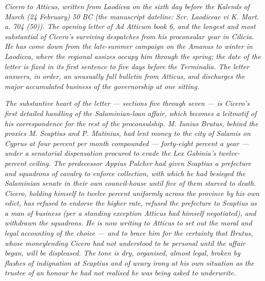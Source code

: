 
\textit{Cicero to Atticus, written from Laodicea on the
sixth day before the Kalends of March (24 February)
50 BC (the manuscript dateline: \textit{Scr.
Laodiceae vi K. Mart. a. 704 (50)}). The opening
letter of \textit{Ad Atticum} book 6, and the longest
and most substantial of Cicero's surviving despatches
from his proconsular year in Cilicia. He has come down
from the late-summer campaign on the Amanus to winter
in Laodicea, where the regional assizes occupy him
through the spring; the date of the letter is fixed in
its first sentence to five days before the Terminalia.
The letter answers, in order, an unusually full
bulletin from Atticus, and discharges the major
accumulated business of the governorship at one
sitting.}

\textit{The substantive heart of the letter --- sections
five through seven --- is Cicero's first detailed
handling of the Salaminian-loan affair, which becomes
a leitmotif of his correspondence for the rest of the
proconsulship. M. Iunius Brutus, behind the proxies
M. Scaptius and P. Matinius, had lent money to the
city of Salamis on Cyprus at four percent per month
compounded --- forty-eight percent a year --- under a
senatorial dispensation procured to evade the Lex
Gabinia's twelve-percent ceiling. The predecessor
Appius Pulcher had given Scaptius a prefecture and
squadrons of cavalry to enforce collection, with which
he had besieged the Salaminian senate in their own
council-house until five of them starved to death.
Cicero, holding himself to twelve percent uniformly
across the province by his own edict, has refused to
endorse the higher rate, refused the prefecture to
Scaptius as a man of business (per a standing
exception Atticus had himself negotiated), and
withdrawn the squadrons. He is now writing to Atticus
to set out the moral and legal accounting of the
choice --- and to brace him for the certainty that
Brutus, whose moneylending Cicero had not understood
to be personal until the affair began, will be
displeased. The tone is dry, organised, almost legal,
broken by flashes of indignation at Scaptius and of
weary irony at his own situation as the trustee of an
honour he had not realised he was being asked to
underwrite.}

